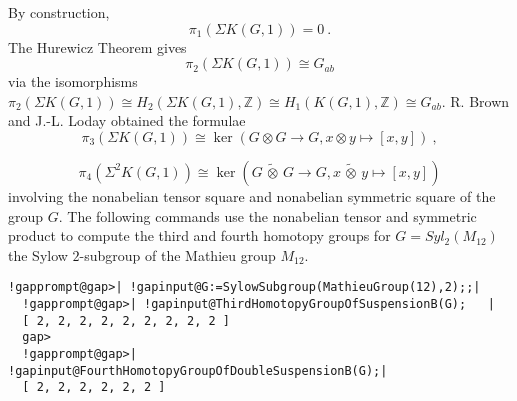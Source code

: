 \documentclass[a4paper,11pt]{report}
\begin{document}
{{By construction, 
\[\pi_1(\Sigma K(G,1))=0\ .\]
 The Hurewicz Theorem gives 
\[\pi_2(\Sigma K(G,1)) \cong G_{ab}\]
 via the isomorphisms $\pi_2(\Sigma K(G,1)) \cong H_2(\Sigma K(G,1),\mathbb Z) \cong
H_1(K(G,1),\mathbb Z) \cong G_{ab}$. R. Brown and J.-L. Loday \cite{brownloday} obtained the formulae 
\[\pi_3(\Sigma K(G,1)) \cong \ker (G\otimes G \rightarrow G, x\otimes y\mapsto
[x,y]) \ ,\]
 
\[\pi_4(\Sigma^2 K(G,1)) \cong \ker (G\, {\widetilde \otimes}\, G \rightarrow G,
x\, {\widetilde \otimes}\, y\mapsto [x,y]) \]
 involving the nonabelian tensor square and nonabelian symmetric square of the
group $G$. The following commands use the nonabelian tensor and symmetric product to
compute the third and fourth homotopy groups for $G =Syl_2(M_{12})$ the Sylow $2$-subgroup of the Mathieu group $M_{12}$. 
\begin{Verbatim}[commandchars=!@|,fontsize=\small,frame=single,label=Example]
  !gapprompt@gap>| !gapinput@G:=SylowSubgroup(MathieuGroup(12),2);;|
  !gapprompt@gap>| !gapinput@ThirdHomotopyGroupOfSuspensionB(G);   |
  [ 2, 2, 2, 2, 2, 2, 2, 2, 2 ]
  gap>
  !gapprompt@gap>| !gapinput@FourthHomotopyGroupOfDoubleSuspensionB(G);|
  [ 2, 2, 2, 2, 2, 2 ]
  
\end{Verbatim}
 }

 
}
\end{document}
